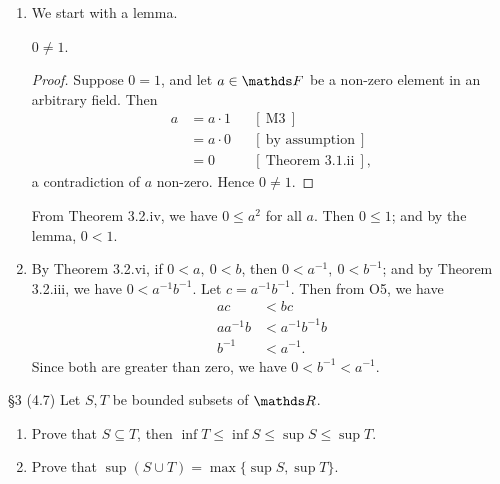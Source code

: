 \documentclass{homework}
\begin{document}
\begin{solution}
  \begin{enumerate}[label=(\alph*)]
    \item We start with a lemma.
      \begin{lemma}[]{}
        $0 \neq 1$.
      \end{lemma}
      \begin{proof}[Proof]
        Suppose $0=1$, and let $a\in \F$ be a non-zero element in an arbitrary field. Then
        \begin{align*}
          a &= a\cdot 1 && [~\text{M3}~] \\
            &= a\cdot 0 &&[~\text{by assumption}~] \\
            &= 0 && [~\text{Theorem 3.1.ii}~]
        ,\end{align*}
        a contradiction of $a$ non-zero. Hence $0\neq 1$.
      \end{proof}
      
      From Theorem 3.2.iv, we have  $0\le a^2$ for all $a$. Then $ 0\le 1$; and by the lemma, $0<1$.
      
    \item By Theorem 3.2.vi, if $0<a,\ 0<b$, then $0<a^{-1},\ 0<b^{-1}$; and by Theorem 3.2.iii, we
      have $0<a^{-1}b^{-1}$. Let $c=a^{-1}b^{-1}$. Then from O5, we have 
      \begin{align*}
        ac &< bc\\
        aa^{-1}b&<a^{-1}b^{-1}b\\
        b^{-1}&<a^{-1}
      .\end{align*} Since both are greater than zero, we have $0<b^{-1}<a^{-1}$.
  \end{enumerate}
\end{solution}

\begin{problem}{\S 3}
  (4.7) Let $S,T$ be bounded subsets of $\R$.
  \begin{enumerate}[label=(\alph*)]
    \item Prove that $S\subseteq T$, then  $\inf T \le \inf S \le \sup S \le \sup T$.
    \item Prove that $\sup(S\cup T)=\max\{ \sup S,\sup T \}$.
  \end{enumerate}
\end{problem}
\end{document}
